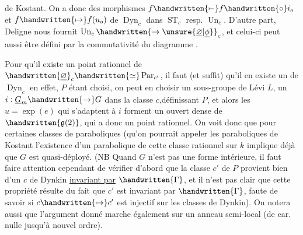 de Kostant. On a donc des morphismes $f\handwritten{\mathrel{\mapstochar\relbar}}f\handwritten{\circ}i_o$ et $f\handwritten{\mapsto}f(u_o)$ de $\operatorname{Dyn}_c$ dans $\operatorname{ST}_c$ resp. $\operatorname{Un}_c$. D'autre part, Deligne nous fournit $\operatorname{Un}_c\handwritten{\to\unsure{\underline{\varnothing}|\underline{\phi}}}_c$, et celui-ci peut aussi être défini par la commutativité du diagramme 
.

Pour qu'il existe un point rationnel de  $\handwritten{\underline{\varnothing}}_c\handwritten{\simeq}\operatorname{Par}_{c'}$, il faut (et suffit) qu'il en existe un de $\operatorname{Dyn}_c$ \handwritten{:} en effet, $P$ étant choisi,  on peut en choisir un  sous-groupe de Lévi $L$, un $i:\underline{G}_m\handwritten{\to}G$ dans la classe $c$,définissant $P$, et alors les $u=\exp(e)$ qui  s'adaptent à $i$ forment un ouvert dense de $\handwritten{\mathfrak{g}(2)}$, qui  a donc un point rationnel. On voit donc que pour certaines classes de paraboliques (qu'on pourrait appeler les paraboliques de Kostant\unsure{)} l'existence d'un parabolique de cette classe rationnel sur $k$ implique déjà que $G$ est quasi-déployé. (NB Quand $G$ n'est pas une forme intérieure, il faut faire attention cependant de vérifier d'abord que la classe $c'$ de $P$ provient bien d'un $c$ de Dynkin \uline{invariant par} $\handwritten{\Gamma}$, et il n'est pas clair que cette propriété résulte du fait que $c'$ est invariant par $\handwritten{\Gamma}$, faute de savoir si $c\handwritten{\mapsto}c'$ est injectif sur les classes de Dynkin). \handwritten{(}On notera aussi que l'argument donné marche également sur un anneau semi-local (de car. nulle jusqu'à nouvel ordre).\handwritten{)}

